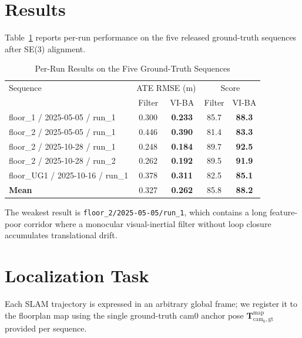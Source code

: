 \documentclass[journal]{IEEEtran}
\begin{document}
\section{Results}

Table~\ref{tab:gt_results} reports per-run performance on the five released
ground-truth sequences after SE(3) alignment.

\begin{table}[!t]
\renewcommand{\arraystretch}{1.2}
\caption{Per-Run Results on the Five Ground-Truth Sequences}
\label{tab:gt_results}
\centering
\begin{tabular}{l c c c c}
\hline
Sequence & \multicolumn{2}{c}{ATE RMSE (m)} & \multicolumn{2}{c}{Score} \\
         & Filter & VI-BA & Filter & VI-BA \\
\hline
floor\_1 / 2025-05-05 / run\_1   & 0.300 & \textbf{0.233} & 85.7 & \textbf{88.3} \\
floor\_2 / 2025-05-05 / run\_1   & 0.446 & \textbf{0.390} & 81.4 & \textbf{83.3} \\
floor\_2 / 2025-10-28 / run\_1   & 0.248 & \textbf{0.184} & 89.7 & \textbf{92.5} \\
floor\_2 / 2025-10-28 / run\_2   & 0.262 & \textbf{0.192} & 89.5 & \textbf{91.9} \\
floor\_UG1 / 2025-10-16 / run\_1 & 0.378 & \textbf{0.311} & 82.5 & \textbf{85.1} \\
\hline
\textbf{Mean}                    & 0.327 & \textbf{0.262} & 85.8 & \textbf{88.2} \\
\hline
\end{tabular}
\end{table}

The weakest result is \texttt{floor\_2/2025-05-05/run\_1}, which contains a
long feature-poor corridor where a monocular visual-inertial filter without
loop closure accumulates translational drift.


\section{Localization Task}

Each SLAM trajectory is expressed in an arbitrary global frame; we register
it to the floorplan map using the single ground-truth cam0 anchor pose
$\mathbf{T}^{\text{map}}_{\text{cam}_0,\text{gt}}$ provided per sequence.
\end{document}
